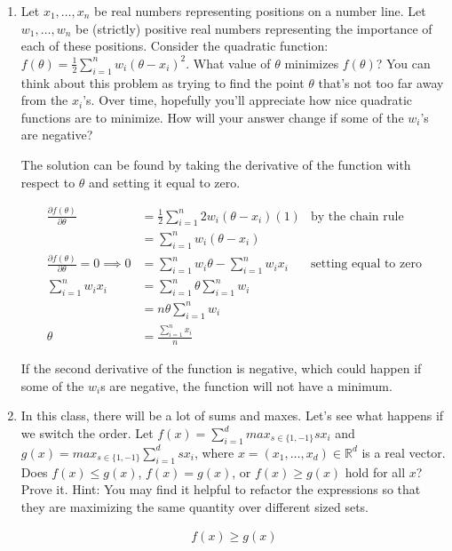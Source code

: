 \documentclass[10pt]{article}
\begin{document}
\begin{enumerate}[label=(\alph*)]

  \item Let $x_1,…,x_n$ be real numbers representing positions on a number line. Let $w_1,…,w_n$ be (strictly) positive real numbers representing the importance of each of these positions. Consider the quadratic function: $f(\theta) = \frac{1}{2} \sum_{i = 1}^{n} w_i(\theta - x_i)^2$. What value of $\theta$ minimizes $f(\theta)$? You can think about this problem as trying to find the point $θ$ that's not too far away from the $x_i$'s. Over time, hopefully you'll appreciate how nice quadratic functions are to minimize. How will your answer change if some of the $w_i$'s are negative?
  
  The solution can be found by taking the derivative of the function with respect to $\theta$ and setting it equal to zero.
  
  \begin{align*}  
  \frac{\partial f(\theta)}{\partial \theta} &= \frac{1}{2} \sum_{i = 1}^{n} 2w_i(\theta - x_i)(1) &\text{by the chain rule}\\
  &= \sum_{i = 1}^{n} w_i(\theta - x_i)\\
  \frac{\partial f(\theta)}{\partial \theta} = 0 \implies 0 &= \sum_{i = 1}^{n} w_i\theta - \sum_{i = 1}^{n} w_ix_i &\text{setting equal to zero}\\
  \sum_{i = 1}^{n} w_ix_i &= \sum_{i = 1}^{n}\theta \sum_{i = 1}^{n} w_i\\
  &= n\theta \sum_{i = 1}^{n} w_i\\
  \theta &= \frac{\sum_{i = 1}^{n} x_i}{n}
  \end{align*}
  
  If the second derivative of the function is negative, which could happen if some of the $w_i$s are negative, the function will not have a minimum.
  
  \item In this class, there will be a lot of sums and maxes. Let's see what happens if we switch the order. Let $f(x) = \sum_{i=1}^{d} max_{s \in \{1,-1\} }sx_i$ and $g(x) = max_{s \in \{1,-1\} } \sum_{i=1}^{d}sx_i$, where $x=(x_1,\dots,x_d)\in \mathbb{R}^d$ is a real vector. Does $f(x) \leq g(x)$, $f(x)=g(x)$, or $f(x) \geq g(x)$ hold for all $x$? Prove it. Hint: You may find it helpful to refactor the expressions so that they are maximizing the same quantity over different sized sets.
  
  \begin{align*}
  f(x) \geq g(x)
  \end{align*}
  

\end{enumerate}
\end{document}
